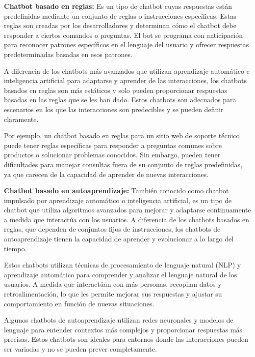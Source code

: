 \documentclass[a4paper,
               ]{jacow}
\begin{document}
\textbf{Chatbot basado en reglas:} Es un tipo de chatbot cuyas respuestas están predefinidas mediante un conjunto de reglas o instrucciones específicas. Estas reglas son creadas por los desarrolladores y determinan cómo el chatbot debe responder a ciertos comandos o preguntas. El bot se programa con anticipación para reconocer patrones específicos en el lenguaje del usuario y ofrecer respuestas predeterminadas basadas en esos patrones.

A diferencia de los chatbots más avanzados que utilizan aprendizaje automático e inteligencia artificial para adaptarse y aprender de las interacciones, los chatbots basados en reglas son más estáticos y solo pueden proporcionar respuestas basadas en las reglas que se les han dado. Estos chatbots son adecuados para escenarios en los que las interacciones son predecibles y se pueden definir claramente.

Por ejemplo, un chatbot basado en reglas para un sitio web de soporte técnico puede tener reglas específicas para responder a preguntas comunes sobre productos o solucionar problemas conocidos. Sin embargo, pueden tener dificultades para manejar consultas fuera de su conjunto de reglas predefinidas, ya que carecen de la capacidad de aprender de nuevas interacciones.

\textbf{Chatbot basado en autoaprendizaje:} También conocido como chatbot impulsado por aprendizaje automático o inteligencia artificial, es un tipo de chatbot que utiliza algoritmos avanzados para mejorar y adaptarse continuamente a medida que interactúa con los usuarios. A diferencia de los chatbots basados en reglas, que dependen de conjuntos fijos de instrucciones, los chatbots de autoaprendizaje tienen la capacidad de aprender y evolucionar a lo largo del tiempo.

Estos chatbots utilizan técnicas de procesamiento de lenguaje natural (NLP) y aprendizaje automático para comprender y analizar el lenguaje natural de los usuarios. A medida que interactúan con más personas, recopilan datos y retroalimentación, lo que les permite mejorar sus respuestas y ajustar su comportamiento en función de nuevas situaciones.

Algunos chatbots de autoaprendizaje utilizan redes neuronales y modelos de lenguaje para entender contextos más complejos y proporcionar respuestas más precisas. Estos chatbots son ideales para entornos donde las interacciones pueden ser variadas y no se pueden prever completamente.
\end{document}
